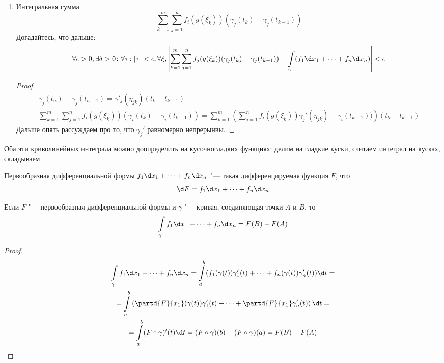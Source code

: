 \begin{enumerate}
\item
	Интегральная сумма
	\[
		\sum_{k=1}^m \sum_{j=1}^n f_i(g(\xi_k)) (\gamma_j(t_k) - \gamma_j(t_{k-1}))
	\]
	Догадайтесь, что дальше:
	\[
		\forall \epsilon > 0, \exists \delta > 0\colon \forall \tau\colon |\tau| < \epsilon, \forall \xi,
		\left| \sum_{k=1}^m\sum_{j=1}^n f_j(g(\xi_k))(\gamma_j(t_k)-\gamma_j(t_{k-1})) - \int\limits_\gamma (f_1\d x_1+\dots+f_n \d x_n)\right|
		< \epsilon
	\]
	\begin{proof}
		\begin{gather*}
			\gamma_j (t_n) - \gamma_j(t_{n-1}) = \gamma'_j(\eta_{jk})(t_k - t_{k-1}) \\
			\sum_{k=1}^m \sum_{j=1}^n f_i(g(\xi_k)) (\gamma_i(t_k) - \gamma_i(t_{k-1}))
			= \sum_{k=1}^m \left( \sum_{j=1}^n f_i(g(\xi_k)) \gamma_j'(\eta_{jk}) - \gamma_i(t_{k-1})) \right) (t_k - t_{k-1})
		\end{gather*}
		Дальше опять рассуждаем про то, что $\gamma_j'$ равномерно непрерынвы.
	\end{proof}
\end{enumerate}

\begin{Rem}
	Оба эти криволинейных интеграла можно доопределить на кусочногладких функциях:
	делим на гладкие куски, считаем интеграл на кусках, складываем.
\end{Rem}

\begin{Def}
	Первообразная дифференциальной формы $f_1 \d x_1 + \dots + f_n \d x_n$ "--- такая дифференцируемая функция $F$, что
	\[ \d F = f_1 \d x_1 + \dots + f_n \d x_n \]
\end{Def}

\begin{theorem}
	Если $F$ "--- первообразная дифференциальной формы и $\gamma$ "--- кривая, соединяющая точки $A$ и $B$, то
	\[ \int\limits_\gamma f_1 \d x_1 + \dots + f_n \d x_n = F(B) - F(A) \]
\end{theorem}
\begin{proof}
	\begin{gather*}
		\int\limits_\gamma f_1 \d x_1 + \dots + f_n \d x_n
		= \int\limits_a^b ( f_1(\gamma(t)) \gamma_1'(t) + \dots + f_n(\gamma(t)) \gamma_n'(t) ) \d t = \\
		= \int\limits_a^b \left( \partd{F}{x_1}(\gamma(t)) \gamma_1'(t) + \dots + \partd{F}{x_1} \gamma_n'(t) \right) \d t = \\
		= \int\limits_a^b (F \circ \gamma)'(t) \d t = (F \circ \gamma)(b) - (F \circ \gamma)(a) = F(B) - F(A)
	\end{gather*}
\end{proof}

